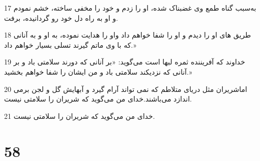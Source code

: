 \par 17 به‌سبب گناه طمع وی غضبناک شده، او را زدم و خود را مخفی ساخته، خشم نمودم و او به راه دل خود رو گردانیده، برفت.
\par 18 طریق های او را دیدم و او را شفا خواهم داد واو را هدایت نموده، به او و به آنانی که با وی ماتم گیرند تسلی بسیار خواهم داد.»
\par 19 خداوند که آفریننده ثمره لبها است می‌گوید: «بر آنانی که دورند سلامتی باد و بر آنانی که نزدیکند سلامتی باد و من ایشان را شفا خواهم بخشید.»
\par 20 اماشریران مثل دریای متلاطم که نمی تواند آرام گیرد و آبهایش گل و لجن برمی اندازد می‌باشند.خدای من می‌گوید که شریران را سلامتی نیست.
\par 21 خدای من می‌گوید که شریران را سلامتی نیست.
 
\chapter{58}

